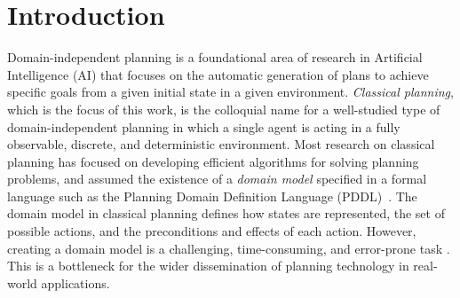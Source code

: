 \documentclass{article}
\theoremstyle{definition}
\theoremstyle{remark}
\newif\ifaddcomments
\newcommand{\roni}[1]{\ifaddcomments{\textcolor{red}{[Roni: #1]}}\fi}
\newcommand{\pascalJr}[1]{\ifaddcomments{\textcolor{cyan}{[Pascal L.: {#1}]}}\fi}
\begin{document}
\section{Introduction}







Domain-independent planning is a foundational area of research in Artificial Intelligence (AI) that focuses on the automatic generation of plans to achieve specific goals from a given initial state in a given environment. 
\emph{Classical planning}, which is the focus of this work, is the colloquial name for a well-studied type of domain-independent planning in which a single agent is acting in a fully observable, discrete, and deterministic environment. 
Most research on classical planning has focused on developing efficient algorithms for solving planning problems, and assumed the existence of a \emph{domain model} specified in a formal language such as the Planning Domain Definition Language (PDDL)~\citep{mcdermott1998pddl}. 
The domain model in classical planning defines how states are represented, the set of possible actions, and the preconditions and effects of each action. 
However, creating a domain model is a challenging, time-consuming, and error-prone task \citep{DBLP:conf/kcap/McCluskeyVV17}.
This is a bottleneck for the wider dissemination of planning technology in real-world applications. 
\end{document}
